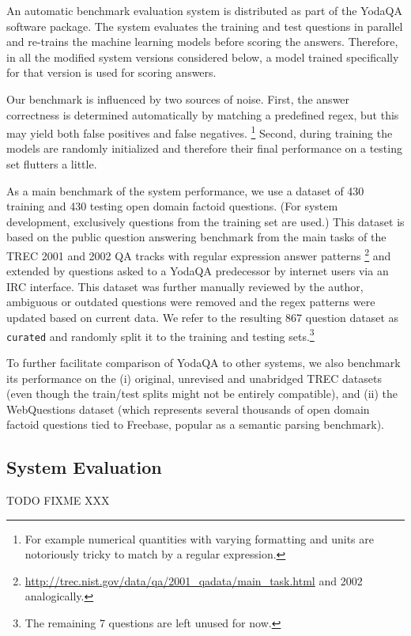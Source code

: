 An automatic benchmark evaluation system is distributed as part of the
YodaQA software package.  The system evaluates the training and test questions
in parallel and re-trains the machine learning models before scoring the answers.
Therefore, in all the modified system versions considered below, a model trained
specifically for that version is used for scoring answers.

Our benchmark is influenced by two sources of noise.
First, the answer correctness is determined automatically by matching a predefined regex,
but this may yield both false positives and false negatives.%
\footnote{For example numerical quantities with varying formatting and units are notoriously tricky to match by a regular expression.}
Second, during training the models are randomly initialized and therefore their final
performance on a testing set flutters a little.

As a main benchmark of the system performance, we use a dataset of 430 training
and 430 testing open domain factoid questions.
(For system development, exclusively questions from the training set are used.)
This dataset is based on the public question answering benchmark from
the main tasks of the TREC 2001 and 2002 QA tracks
with regular expression answer patterns%
\footnote{\url{http://trec.nist.gov/data/qa/2001_qadata/main_task.html} and 2002 analogically.}
and extended by questions asked
to a YodaQA predecessor by internet users via an IRC interface.
This dataset was further manually reviewed by the author,
ambiguous or outdated questions were removed
and the regex patterns were updated based on current data.
We refer to the resulting 867 question dataset as \texttt{curated} and
randomly split it to the training and testing sets.\footnote{The remaining
7 questions are left unused for now.}

To further facilitate comparison of YodaQA to other systems,
we also benchmark its performance on the (i) original, unrevised and
unabridged TREC datasets
(even though the train/test splits might not be entirely compatible),
and (ii) the WebQuestions dataset \cite{WebQuestions}
(which represents several thousands of open domain factoid questions
tied to Freebase, popular as a semantic parsing benchmark).

\subsection{System Evaluation}

TODO FIXME XXX

